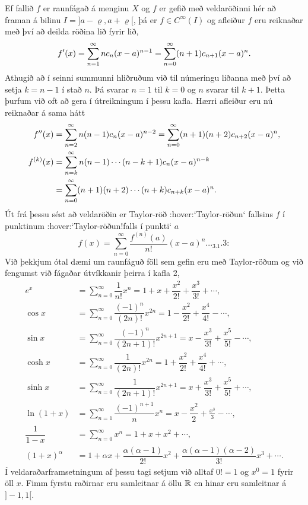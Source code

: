 Ef fallið $f$ er raunfágað á menginu $X$ og $f$ er gefið með
veldaröðinni
hér að framan  á bilinu $I=]a-{\varrho},a+{\varrho}[$, þá er $f\in
C^{\infty}(I)$ og afleiður $f$ eru reiknaðar með því að deilda röðina
lið fyrir lið,
$$f{\sp{\prime}}(x)= \sum\limits_{n=1}^\infty nc_n(x-a)^{n-1}
= \sum\limits_{n=0}^\infty (n+1)c_{n+1}(x-a)^n.
$$
Athugið að í seinni summunni hliðruðum við til númeringu liðanna
með því að setja $k=n-1$ í stað $n$.  Þá svarar $n=1$ til $k=0$
og $n$ svarar til $k+1$.  Þetta þurfum við oft að gera í útreikningum
í þessu kafla.  Hærri afleiður eru nú reiknaðar á sama hátt
\begin{align*}
f{\sp{\prime\prime}}(x)&= \sum\limits_{n=2}^\infty n(n-1)c_n(x-a)^{n-2}
= \sum\limits_{n=0}^\infty (n+1)(n+2)c_{n+2}(x-a)^n,\\
f^{(k)}(x)&= \sum\limits_{n=k}^\infty n(n-1)\cdots (n-k+1)c_n(x-a)^{n-k}\\
&= \sum\limits_{n=0}^\infty (n+1)(n+2)\cdots(n+k)c_{n+k}(x-a)^n.
\end{align*}
Út frá þessu sést að veldaröðin  er
Taylor-röð :hover:`Taylor-röðun` fallsins $f$ í
punktinum :hover:`Taylor-röðun!falls í punkti` $a$
\begin{equation*}
f(x)=\sum\limits_{n=0}^\infty \dfrac{f^{(n)}(a)}{n!}(x-a)^{n}.


.. _3.1.3:

\end{equation*}
Við þekkjum ótal dæmi um raunfáguð föll sem gefin eru með
Taylor-röðum og við fengumst við fágaðar útvíkkanir þeirra í 
kafla 2,
\begin{align*}
e^x&=\sum\limits_{n=0}^\infty\dfrac 1{n!}{x^n}
=1+x+\dfrac {x^2}{2!}+\dfrac{x^3}{3!}+\cdots,\\
\cos x&= \sum\limits_{n=0}^\infty \dfrac{(-1)^n}{(2n)!}x^{2n}
=1-\dfrac{x^2}{2!}+\dfrac{x^4}{4!}-\cdots,\\
\sin x &=\sum\limits_{n=0}^\infty\dfrac{(-1)^n}{(2n+1)!}x^{2n+1}
= x-\dfrac {x^3}{3!}+\dfrac{x^5}{5!}-\cdots,\\
\cosh x&=\sum\limits_{n=0}^\infty\dfrac{1}{(2n)!}x^{2n}
=1+\dfrac{x^2}{2!}+\dfrac{x^4}{4!}+\cdots,\\
\sinh x &=\sum\limits_{n=0}^\infty\dfrac{1}{(2n+1)!}x^{2n+1}
= x+\dfrac {x^3}{3!}+\dfrac{x^5}{5!}+\cdots,\\
\ln (1+x) &= \sum\limits_{n=1}^\infty\dfrac{(-1)^{n+1}}{n}x^n
=x-\dfrac{x^2}{2}+\frac{x^3}3-\cdots,\\
\dfrac 1{1-x}&=\sum\limits_{n=0}^\infty x^n
=1+x+x^2+\cdots, \\
(1+x)^\alpha&= 1+\alpha x+ \dfrac{\alpha(\alpha-1)}{2!}x^2 + 
\dfrac {\alpha(\alpha-1)(\alpha-2)}{3!}x^3+\cdots.
\end{align*}
Í veldaraðarframsetningum af þessu tagi setjum við alltaf $0!=1$
og $x^0=1$ fyrir öll $x$.  Fimm fyrstu raðirnar eru samleitnar á
öllu
${\mathbb R}$ en hinar eru samleitnar á $]-1,1[$.


